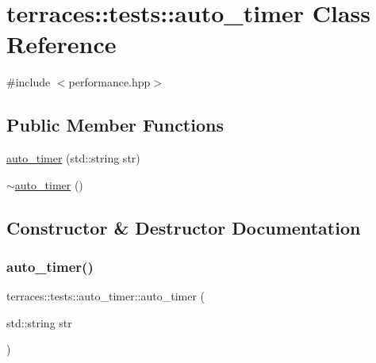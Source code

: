 \hypertarget{classterraces_1_1tests_1_1auto__timer}{}\section{terraces\+:\+:tests\+:\+:auto\+\_\+timer Class Reference}
\label{classterraces_1_1tests_1_1auto__timer}


{\ttfamily \#include $<$performance.\+hpp$>$}

\subsection*{Public Member Functions}
\begin{DoxyCompactItemize}
\item 
\hyperlink{classterraces_1_1tests_1_1auto__timer_a8add438fa6324a66143c876d1e49e8c8}{auto\+\_\+timer} (std\+::string str)
\item 
\hyperlink{classterraces_1_1tests_1_1auto__timer_a5f0a9efe7c2675024b7c2aaef3fb8766}{$\sim$auto\+\_\+timer} ()
\end{DoxyCompactItemize}


\subsection{Constructor \& Destructor Documentation}
\mbox{\label{classterraces_1_1tests_1_1auto__timer_a8add438fa6324a66143c876d1e49e8c8}} 
\subsubsection{\texorpdfstring{auto\+\_\+timer()}{auto\_timer()}}
{\footnotesize\ttfamily terraces\+::tests\+::auto\+\_\+timer\+::auto\+\_\+timer (\begin{DoxyParamCaption}\item[{std\+::string}]{str }\end{DoxyParamCaption})\hspace{0.3cm}{\ttfamily [inline]}}

\mbox{\label{classterraces_1_1tests_1_1auto__timer_a5f0a9efe7c2675024b7c2aaef3fb8766}} 
